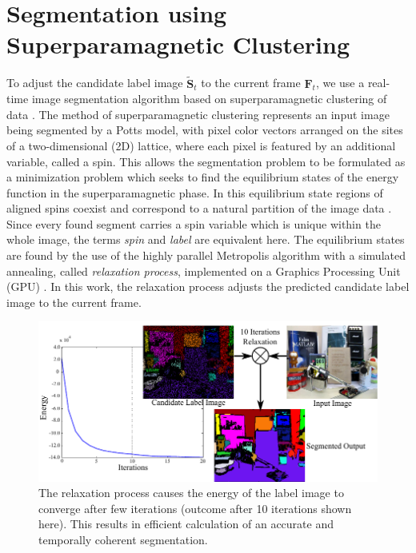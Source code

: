 \section{Segmentation using Superparamagnetic Clustering}
To adjust the candidate label image $\tilde{\mathbf{S}}_{t}$ to the current frame $\mathbf{F}_{t}$, we use a real-time image segmentation algorithm based on superparamagnetic clustering of data \cite{Blatt_SuperClustering}. The method of superparamagnetic clustering represents an input image being segmented by a Potts model, with pixel color vectors arranged on the sites of a two-dimensional (2D) lattice, where each pixel is featured by an additional variable, called a spin. This allows the segmentation problem to be formulated as a minimization problem which seeks to find the equilibrium states of the energy function in the superparamagnetic phase. In this equilibrium state regions of aligned spins coexist and correspond to a natural partition of the image data \cite{Blatt_SuperClustering}. Since every found segment carries a spin variable which is unique within the whole image, the terms {\em spin} and {\em label} are equivalent here. The equilibrium states are found by the use of the highly parallel 
Metropolis algorithm with a simulated annealing, called {\em relaxation process}, implemented on a Graphics Processing Unit (GPU) \cite{Abramov_RealtimeSegmentation}. In this work, the relaxation process adjusts the predicted candidate label image to the current frame. 

\begin{figure}
\label{fig:Convergence}
\centering
\includegraphics[width=\linewidth]{figures/ECCV2012/ConvergenceFig2.pdf}
\caption[Relaxation Convergence]{The relaxation process causes the energy of the label image to converge after few iterations (outcome after 10 iterations shown here). This results in efficient calculation of an accurate and temporally coherent segmentation.}
\label{fig:Convergence}
\end{figure}

